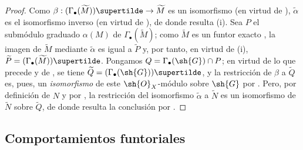 \documentclass[oneside,10pt]{amsart}
\makeatletter
\newcommand{\ega@arrow}[2]{\mathchoice{#1}{#2}{#2}{#2}}
\renewcommand{\to}{\ega@arrow{\longrightarrow}{\rightarrow}}
\let\EGAOriginalLabel\label
\renewcommand{\label}[1]{\phantomsection\EGAOriginalLabel{#1}}
\makeatother
\begin{document}
\begin{proof}
Como $\beta:(\Gamma_\bullet(\widetilde{M}))\supertilde\to\widetilde{M}$ es un isomorfismo (en virtud de ), $\widetilde{\alpha}$ es el isomorfismo inverso (en virtud de ), de donde resulta (i).
Sea $P$ el submódulo graduado $\alpha(M)$ de $\Gamma_\bullet(\widetilde{M})$;
como $\widetilde{M}$ es un funtor exacto , la imagen de $\widetilde{M}$ mediante $\widetilde{\alpha}$ es igual a $\widetilde{P}$ y, por tanto, en virtud de (i), $\widetilde{P}=(\Gamma_\bullet(\widetilde{M}))\supertilde$.
Pongamos $Q=\Gamma_\bullet(\sh{G})\cap P$; en virtud de lo que precede y de , se tiene $\widetilde{Q}=(\Gamma_\bullet(\sh{G}))\supertilde$, y la restricción de $\beta$ a $\widetilde{Q}$ es, pues, un \emph{isomorfismo} de este $\sh{O}_X$-módulo sobre $\sh{G}$ por .
Pero, por definición de $N$ y por , la restricción del isomorfismo $\widetilde{\alpha}$ a $\widetilde{N}$ es un isomorfismo de $\widetilde{N}$ sobre $\widetilde{Q}$, de donde resulta la conclusión por .
\end{proof}

\subsection{Comportamientos funtoriales}
\label{subsection:II.2.8}
\end{document}
